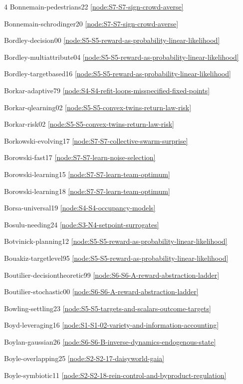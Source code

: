\documentclass[10pt]{article}
\begin{document}
{\begin{multicols}{4}
Bonnemain-pedestrians22 \hfill \ref{node:S7-S7-sign-crowd-averse}\par
Bonnemain-schrodinger20 \hfill \ref{node:S7-S7-sign-crowd-averse}\par
Bordley-decision00 \hfill \ref{node:S5-S5-reward-as-probability-linear-likelihood}\par
Bordley-multiattribute04 \hfill \ref{node:S5-S5-reward-as-probability-linear-likelihood}\par
Bordley-targetbased16 \hfill \ref{node:S5-S5-reward-as-probability-linear-likelihood}\par
Borkar-adaptive79 \hfill \ref{node:S4-S4-refit-loops-misspecified-fixed-points}\par
Borkar-qlearning02 \hfill \ref{node:S5-S5-convex-twins-return-law-risk}\par
Borkar-risk02 \hfill \ref{node:S5-S5-convex-twins-return-law-risk}\par
Borkowski-evolving17 \hfill \ref{node:S7-S7-collective-swarm-surprise}\par
Borowski-fast17 \hfill \ref{node:S7-S7-learn-noise-selection}\par
Borowski-learning15 \hfill \ref{node:S7-S7-learn-team-optimum}\par
Borowski-learning18 \hfill \ref{node:S7-S7-learn-team-optimum}\par
Borsa-universal19 \hfill \ref{node:S4-S4-occupancy-models}\par
Bosulu-needing24 \hfill \ref{node:S3-N4-setpoint-surrogates}\par
Botvinick-planning12 \hfill \ref{node:S5-S5-reward-as-probability-linear-likelihood}\par
Bouakiz-targetlevel95 \hfill \ref{node:S5-S5-reward-as-probability-linear-likelihood}\par
Boutilier-decisiontheoretic99 \hfill \ref{node:S6-S6-A-reward-abstraction-ladder}\par
Boutilier-stochastic00 \hfill \ref{node:S6-S6-A-reward-abstraction-ladder}\par
Bowling-settling23 \hfill \ref{node:S5-S5-targets-and-scalars-outcome-targets}\par
Boyd-leveraging16 \hfill \ref{node:S1-S1-02-variety-and-information-accounting}\par
Boylan-gaussian26 \hfill \ref{node:S6-S6-B-inverse-dynamics-endogenous-state}\par
Boyle-overlapping25 \hfill \ref{node:S2-S2-17-daisyworld-gaia}\par
Boyle-symbiotic11 \hfill \ref{node:S2-S2-18-rein-control-and-byproduct-regulation}\par

\end{multicols}}
\end{document}
